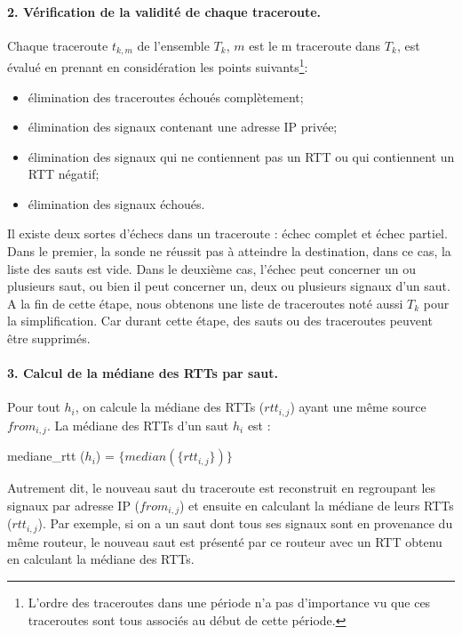 \paragraph{2. Vérification de la validité de chaque traceroute.} 
Chaque traceroute $t_{k,m}$ de l'ensemble $T_k$, $m$  est le m  traceroute dans $T_k$,  est évalué en prenant en considération  les points suivants\footnote{L'ordre  des traceroutes dans une période n'a pas d'importance vu que ces traceroutes sont tous associés au début de cette période.}:
\begin{itemize}
	\item élimination des traceroutes échoués complètement;
	\item élimination des signaux contenant une adresse IP privée;
	\item élimination des signaux qui ne contiennent pas un RTT ou  qui contiennent un RTT négatif;
	\item élimination des signaux échoués.
\end{itemize}

Il existe deux sortes d'échecs dans un traceroute : échec complet et échec partiel. Dans le premier,   la sonde  ne réussit pas à atteindre la destination, dans ce cas, la liste des sauts est vide. Dans le deuxième cas, l'échec peut concerner un ou plusieurs saut, ou bien il peut concerner un, deux ou plusieurs signaux d'un saut. A la fin de cette étape, nous obtenons une liste de traceroutes noté aussi $T_k$ pour la simplification. Car durant cette étape, des sauts ou des traceroutes peuvent être supprimés.

\paragraph{3. Calcul de la médiane des RTTs par saut.} 
Pour tout $ h_i $,  on calcule la médiane des RTTs ($ rtt_{i, j} $) ayant une même source $from_{i,j}$.  La médiane des RTTs d'un saut $h_i$ est  :

mediane\_rtt ($h_i$) =  $\{median(\{rtt_{i, j}  \})\}$

Autrement dit, le nouveau saut du traceroute est reconstruit en regroupant les signaux par adresse IP ($ from_{i, j} $) et ensuite en calculant la médiane de leurs RTTs ($rtt_{i,j}$). Par exemple, si on a un saut dont tous ses  signaux sont en provenance du même routeur, le nouveau saut est présenté par ce routeur avec un RTT obtenu en calculant la médiane des  RTTs.


